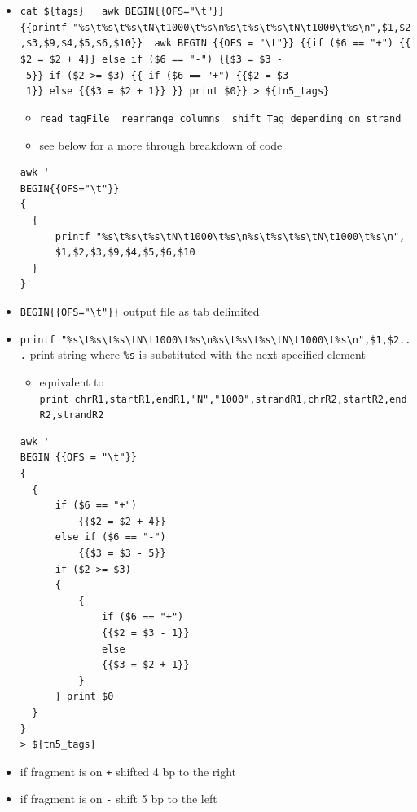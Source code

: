 \documentclass[
]{book}
\providecommand{\tightlist}{%
  \setlength{\itemsep}{0pt}\setlength{\parskip}{0pt}}
\begin{document}
\begin{itemize}
\tightlist
\item
  \texttt{cat\ \$\{tags\}\ \textbar{}\ \ awk\ \textquotesingle{}BEGIN\{\{OFS="\textbackslash{}t"\}\}\{\{printf\ "\%s\textbackslash{}t\%s\textbackslash{}t\%s\textbackslash{}tN\textbackslash{}t1000\textbackslash{}t\%s\textbackslash{}n\%s\textbackslash{}t\%s\textbackslash{}t\%s\textbackslash{}tN\textbackslash{}t1000\textbackslash{}t\%s\textbackslash{}n",\$1,\$2,\$3,\$9,\$4,\$5,\$6,\$10\}\}\textquotesingle{}\ \textbar{}\ awk\ \textquotesingle{}BEGIN\ \{\{OFS\ =\ "\textbackslash{}t"\}\}\ \{\{if\ (\$6\ ==\ "+")\ \{\{\$2\ =\ \$2\ +\ 4\}\}\ else\ if\ (\$6\ ==\ "-")\ \{\{\$3\ =\ \$3\ -\ 5\}\}\ if\ (\$2\ \textgreater{}=\ \$3)\ \{\{\ if\ (\$6\ ==\ "+")\ \{\{\$2\ =\ \$3\ -\ 1\}\}\ else\ \{\{\$3\ =\ \$2\ +\ 1\}\}\ \}\}\ print\ \$0\}\}\textquotesingle{}\ \textgreater{}\ \$\{tn5\_tags\}}

  \begin{itemize}
  \tightlist
  \item
    \texttt{read\ tagFile\ \textbar{}\ rearrange\ columns\ \textbar{}\ shift\ Tag\ depending\ on\ strand}
  \item
    see below for a more through breakdown of code
  \end{itemize}

\begin{verbatim}
awk '
BEGIN{{OFS="\t"}}
{
  {
      printf "%s\t%s\t%s\tN\t1000\t%s\n%s\t%s\t%s\tN\t1000\t%s\n",
      $1,$2,$3,$9,$4,$5,$6,$10
  }
}'
\end{verbatim}
\item
  \texttt{BEGIN\{\{OFS="\textbackslash{}t"\}\}} output file as tab delimited
\item
  \texttt{printf\ "\%s\textbackslash{}t\%s\textbackslash{}t\%s\textbackslash{}tN\textbackslash{}t1000\textbackslash{}t\%s\textbackslash{}n\%s\textbackslash{}t\%s\textbackslash{}t\%s\textbackslash{}tN\textbackslash{}t1000\textbackslash{}t\%s\textbackslash{}n",\$1,\$2...} print string where \texttt{\%s} is substituted with the next specified element

  \begin{itemize}
  \tightlist
  \item
    equivalent to \texttt{print\ chrR1,startR1,endR1,"N","1000",strandR1,chrR2,startR2,endR2,strandR2}
  \end{itemize}

\begin{verbatim}
awk '
BEGIN {{OFS = "\t"}} 
{
  {
      if ($6 == "+") 
          {{$2 = $2 + 4}} 
      else if ($6 == "-") 
          {{$3 = $3 - 5}} 
      if ($2 >= $3) 
      {
          { 
              if ($6 == "+") 
              {{$2 = $3 - 1}} 
              else 
              {{$3 = $2 + 1}} 
          }
      } print $0
  }
}' 
> ${tn5_tags}
\end{verbatim}
\item
  if fragment is on \texttt{+} shifted 4 bp to the right
\item
  if fragment is on \texttt{-} shift 5 bp to the left


\end{itemize}
\end{document}
